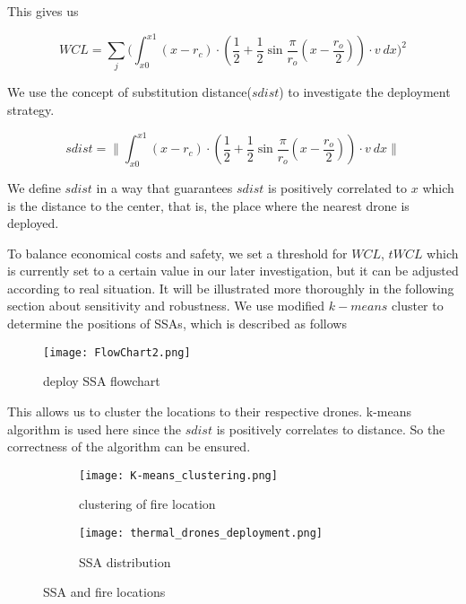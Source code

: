 \documentclass[../main]{subfiles}
\begin{document}
This gives us

\begin{equation}
WCL=\sum_j \Bigg(\int _{x0} ^{x1}  { (x-r_c)\cdot (\frac 1 2 + \frac 1 2 \sin \frac {\pi} {r_o}(x-\frac {r_o} {2} ))} \cdot  v  \  dx \Bigg)^2
\end{equation}

We use the concept of substitution distance(\(sdist\)) to investigate
the deployment strategy.

\begin{equation}
sdist=\Bigg\| \int _{x0} ^{x1}  { (x-r_c)\cdot (\frac 1 2 + \frac 1 2 \sin \frac {\pi} {r_o}(x-\frac {r_o} {2} ))} \cdot  v  \  dx \Bigg\|
\end{equation}

We define \(sdist\) in a way that guarantees \(sdist\) is positively
correlated to \(x\) which is the distance to the center, that is, the
place where the nearest drone is deployed.

To balance economical costs and safety, we set a threshold for \(WCL\),
\(tWCL\) which is currently set to a certain value in our later
investigation, but it can be adjusted according to real situation. It
will be illustrated more thoroughly in the following section about
sensitivity and robustness. We use modified \(k-means\) cluster to
determine the positions of SSAs, which is described as follows

\begin{figure}[h!]
      \texttt{[image: FlowChart2.png]}
      \caption{deploy SSA flowchart}
    \end{figure}

This allows us to cluster the locations to their respective drones.
k-means algorithm is used here since the \(sdist\) is positively
correlates to distance. So the correctness of the algorithm can be
ensured.



\begin{figure}[h!]
      \centering
      \begin{subfigure}[b]{0.4\linewidth}
        \texttt{[image: K-means\_clustering.png]}
        \caption{clustering of fire location}
      \end{subfigure}
      \begin{subfigure}[b]{0.4\linewidth}
        \texttt{[image: thermal\_drones\_deployment.png]}
        \caption{SSA distribution}
      \end{subfigure}
      \caption{SSA and fire locations}
      \label{fig:coffee}
    \end{figure}
\end{document}
